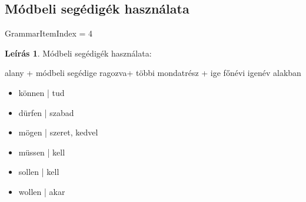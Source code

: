 \documentclass{article}
\theoremstyle{definition}
\newtheorem*{desc}{Leírás}
\begin{document}
\subsection{Módbeli segédigék használata}

GrammarItemIndex = 4

\begin{desc}
Módbeli segédigék használata:

alany + módbeli segédige ragozva+ többi mondatrész + ige főnévi igenév alakban 

\begin{itemize}
\item können | tud
\item dürfen | szabad
\item mögen | szeret, kedvel
\item müssen | kell
\item sollen | kell
\item wollen | akar
\end{itemize}
\end{desc}
\end{document}
